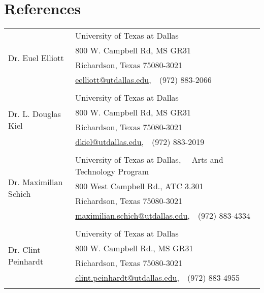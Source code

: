 \documentclass[a4paper,10pt]{article}
\begin{document}
\section{References}
\begin{tabular}{ll}
 \multirow{4}{*}{Dr. Euel Elliott} & University of Texas at Dallas \\ 
& 800 W. Campbell Rd, MS GR31\\
& Richardson, Texas 75080-3021\\
& \href{mailto:eelliott@utdallas.edu}{eelliott@utdallas.edu},~~(972) 883-2066\\
&\\


 \multirow{4}{*}{Dr. L. Douglas Kiel} & University of Texas at Dallas \\ 
& 800 W. Campbell Rd, MS GR31\\
& Richardson, Texas 75080-3021\\
& \href{mailto:dkiel@utdallas.edu}{dkiel@utdallas.edu},~~(972)  883-2019\\
&\\


\multirow{4}{*}{Dr. Maximilian Schich} & University of Texas at Dallas, ~~Arts and Technology Program\\
&800 West Campbell Rd., ATC 3.301\\
&Richardson, Texas 75080-3021 \\ 
& \href{mailto:maximilian.schich@utdallas.edu}{maximilian.schich@utdallas.edu},~~(972) 883-4334\\
&\\


\multirow{4}{*}{Dr. Clint Peinhardt} & University of Texas at Dallas \\ 
& 800 W. Campbell Rd., MS GR31\\
& Richardson, Texas 75080-3021\\
& \href{mailto:clint.peinhardt@utdallas.edu}{clint.peinhardt@utdallas.edu},~~(972) 883-4955\\
&\\
\hline
\end{tabular}
\end{document}
